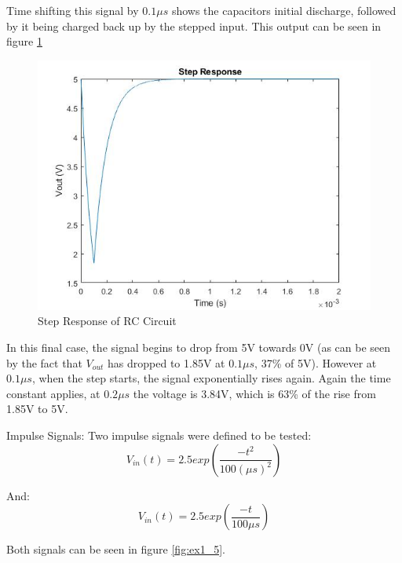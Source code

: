 \documentclass[11pt, oneside, titlepage]{article}   	%
\begin{document}
Time shifting this signal by $0.1\mu s$ shows the capacitors initial discharge, followed by it being charged back up by the stepped input. This output can be seen in figure \ref{fig:ex1_4}

\begin{figure}[H]
\center
\includegraphics[scale = 0.5]{exercise1_4}
\caption{Step Response of RC Circuit} \label{fig:ex1_4}
\end{figure}

In this final case, the signal begins to drop from 5V towards 0V (as can be seen by the fact that $V_{out}$ has dropped to 1.85V at $0.1\mu s$, 37\% of 5V). However at $0.1\mu s$, when the step starts, the signal exponentially rises again. Again the time constant applies, at $0.2\mu s$ the voltage is 3.84V, which is 63\% of the rise from 1.85V to 5V. 


Impulse Signals: Two impulse signals were defined to be tested: 
\begin{equation}
V_{in}(t)=2.5exp(\frac{-t^2}{100(\mu s)^2})
\end{equation}

And:
\begin{equation}
V_{in}(t)=2.5exp(\frac{-t}{100\mu s})
\end{equation}

Both signals can be seen in figure \ref{fig:ex1_5}.
\end{document}
